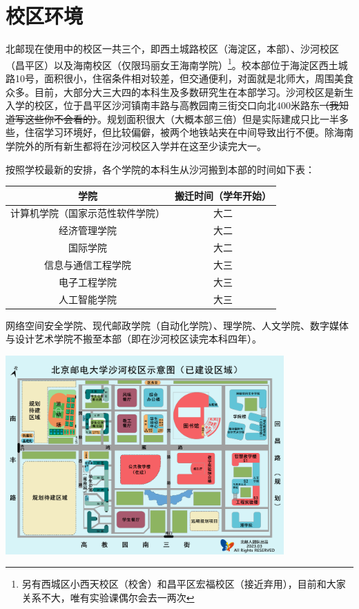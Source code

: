 \section{校区环境}

北邮现在使用中的校区一共三个，即西土城路校区（海淀区，本部）、沙河校区（昌平区）以及海南校区（仅限玛丽女王海南学院）\footnote{另有西城区小西天校区（校舍）和昌平区宏福校区（接近弃用），目前和大家关系不大，唯有实验课偶尔会去一两次}。校本部位于海淀区西土城路10号，面积很小，住宿条件相对较差，但交通便利，对面就是北师大，周围美食众多。目前，大部分大三大四的本科生及多数研究生在本部学习。沙河校区是新生入学的校区，位于昌平区沙河镇南丰路{\small{}与高教园南三街交口向北400米路东\sout{（我知道写这些你不会看的）}}。规划面积很大（大概本部三倍）但是实际建成只比一半多些，住宿学习环境好，但比较偏僻，被两个地铁站夹在中间导致出行不便。除海南学院外的所有新生都将在沙河校区入学并在这至少读完大一。

按照学校最新的安排，各个学院的本科生从沙河搬到本部的时间如下表：

\begin{center}
    \begin{tabular}{cc}
        \toprule
        学院 & 搬迁时间（学年开始） \\
        \midrule
        计算机学院（国家示范性软件学院） & 大二 \\
        经济管理学院 & 大二 \\
        国际学院 & 大二\\
        信息与通信工程学院 & 大三 \\
        电子工程学院 & 大三 \\
        人工智能学院 & 大三 \\
        \bottomrule
    \end{tabular}
\end{center}

网络空间安全学院、现代邮政学院（自动化学院）、理学院、人文学院、数字媒体与设计艺术学院不搬至本部（即在沙河校区读完本科四年）。

\begin{center}
    \includegraphics[width=0.80\textwidth]{images/shahe-map.jpg}
\end{center}

